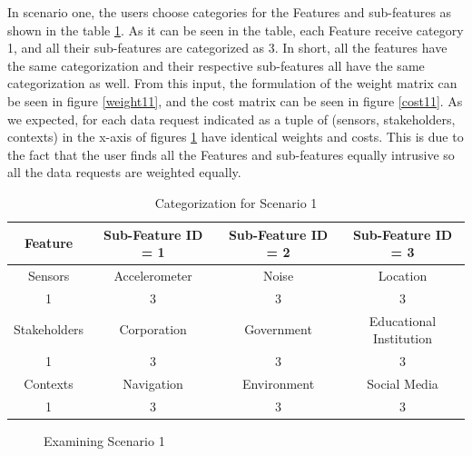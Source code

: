 In scenario one, the users choose categories for the Features and sub-features as shown in the table \ref{tab:scenario11}. As it can be seen in the table, each Feature receive
category 1, and all their sub-features are categorized as 3. In short, all the features have the same categorization and their respective
sub-features all have the same categorization as well. From this input, the formulation of the weight matrix can be seen in figure \ref{weight11}, and the cost matrix can be seen in figure \ref{cost11}.
As we expected, for each data request indicated as a tuple of (sensors, stakeholders, contexts) in the x-axis of figures \ref{fig:scenatio11} have identical weights and costs. This is due to the fact that the user finds all the Features and sub-features equally intrusive so all the data requests are weighted equally.

\begin{table}[h!]
  \centering
  \caption{Categorization for Scenario 1}
  \label{tab:scenario11}
  \begin{tabular}{cccc}
    \toprule
    Feature & Sub-Feature ID = 1 & Sub-Feature ID = 2 & Sub-Feature ID = 3\\
    \midrule
    Sensors & Accelerometer & Noise & Location\\
     1 & 3 & 3 & 3\\ \hhline{====}
     Stakeholders & Corporation & Government & Educational Institution\\
     1 & 3 & 3 & 3\\ \hhline{====}
     Contexts & Navigation & Environment & Social Media\\
     1 & 3 & 3 & 3\\ 
    \bottomrule
  \end{tabular}
\end{table}
 
\begin{figure}[htp]
  \caption{Examining Scenario 1}
  \label{fig:scenatio11}
\end{figure}

